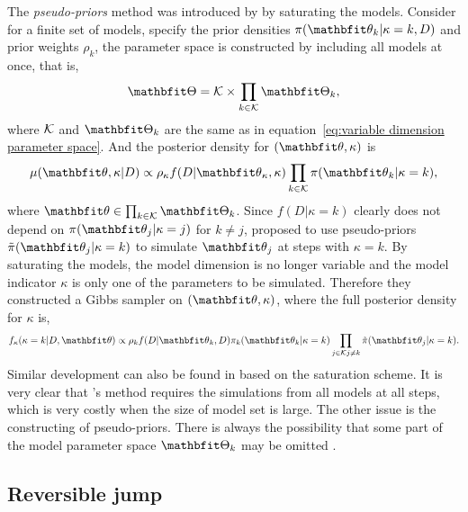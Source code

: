 The \emph{pseudo-priors} method was introduced by \textcite{Carlin1995} by
saturating the models. Consider for a finite set of models, specify the prior
densities $\pi(\bth_k|\kappa=k,D)$ and prior weights $\rho_k$, the parameter
space is constructed by including all models at once, that is,
\begin{equation}
  \bTh = \calK \times \prod_{k\in\calK}\bTh_k,
\end{equation}
where $\mathcal{K}$ and $\bTh_k$ are the same as in equation~\eqref{eq:variable
  dimension parameter space}. And the posterior density for $(\bth, \kappa)$
is
\begin{equation}
  \mu(\bth,\kappa|D) \propto
  \rho_{\kappa} f(D|\bth_{\kappa},\kappa)
  \prod_{k\in\calK}\pi(\bth_k|\kappa=k),
\end{equation}
where $\bth \in \prod_{k\in\calK}\bTh_k$. Since $f(D|\kappa=k)$ clearly does
not depend on $\pi(\bth_j|\kappa=j)$ for $k \ne j$, \textcite{Carlin1995}
proposed to use pseudo-priors $\tilde\pi(\bth_j|\kappa=k)$ to simulate
$\bth_j$ at steps with $\kappa = k$. By saturating the models, the model
dimension is no longer variable and the model indicator $\kappa$ is only one
of the parameters to be simulated. Therefore they constructed a Gibbs sampler
on $(\bth,\kappa)$, where the full posterior density for $\kappa$ is,
\begin{equation}
  f_{\kappa}(\kappa = k|D,\bth)
  \propto \rho_k f(D|\bth_k,D) \pi_k(\bth_k|\kappa=k)
  \prod_{\substack{j\in\calK}\\j \ne k} \tilde\pi(\bth_j|\kappa = k).
\end{equation}
Similar development can also be found in \textcite{Brooks2003,Besag2001} based
on the saturation scheme. It is very clear that \textcite{Carlin1995}'s method
requires the simulations from all models at all steps, which is very costly
when the size of model set is large. The other issue is the constructing of
pseudo-priors. There is always the possibility that some part of the model
parameter space $\bTh_k$ may be omitted \parencites[see][chap.~7]{Robert2007}.

\subsection{Reversible jump \protect\mcmc}
\label{sub:Reversible jump mcmc}

